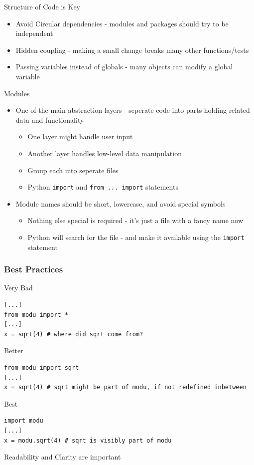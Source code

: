 \documentclass[11pt,professionalfonts]{beamer}
\begin{document}
\begin{frame}{Structure of Code is Key}
    \begin{itemize}
        \item Avoid Circular dependencies - modules and packages should try to be independent
        \item Hidden coupling - making a small change breaks many other functions/tests
        \item Passing variables instead of globals - many objects can modify a global variable
    \end{itemize}
\end{frame}

\begin{frame}{Modules}
    \begin{itemize}
        \item One of the main abstraction layers - seperate code into parts holding related data and functionality
            \begin{itemize}
                \item One layer might handle user input 
                \item Another layer handles low-level data manipulation
                \item Group each into seperate files
                \item Python \texttt{import} and \texttt{from ... import} statements
            \end{itemize}
        \item Module names should be short, lowercase, and avoid special symbols
            \begin{itemize}
                \item Nothing else special is required - it's just a file with a fancy name now
                \item Python will search for the file - and make it available using the \texttt{import} statement
            \end{itemize}
    \end{itemize}


\end{frame}

\begin{frame}[fragile]\frametitle{Best Practices}
Very Bad
\begin{verbatim}
[...]
from modu import *
[...]
x = sqrt(4) # where did sqrt come from?
\end{verbatim}
\pause
Better
\begin{verbatim}
from modu import sqrt
[...]
x = sqrt(4) # sqrt might be part of modu, if not redefined inbetween
\end{verbatim}
\pause
Best
\begin{verbatim}
import modu
[...]
x = modu.sqrt(4) # sqrt is visibly part of modu
\end{verbatim}

\pause
\begin{alertblock}{}
    \centering
Readability and Clarity are important
\end{alertblock}
\end{frame}
\end{document}
